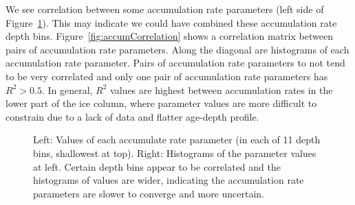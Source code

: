We see correlation between some accumulation rate parameters (left side of Figure~\ref{fig:accumconvergence}). This may indicate we could have combined these accumulation rate depth bins. Figure~\ref{fig:accumCorrelation} shows a correlation matrix between pairs of accumulation rate parameters. Along the diagonal are histograms of each accumulation rate parameter. Pairs of accumulation rate parameters to not tend to be very correlated and only one pair of accumulation rate parameters has $R^2 > 0.5$. In general, $R^2$ values are highest between accumulation rates in the lower part of the ice column, where parameter values are more difficult to constrain due to a lack of data and flatter age-depth profile.


\begin{figure}[ht]
\centering
{}
\caption[]{Left: Values of each accumulate rate parameter (in each of 11 depth bins, shallowest at top). Right: Histograms of the parameter values at left. Certain depth bins appear to be correlated and the histograms of values are wider, indicating the accumulation rate parameters are slower to converge and more uncertain.}
\label{fig:accumconvergence}
\end{figure}

